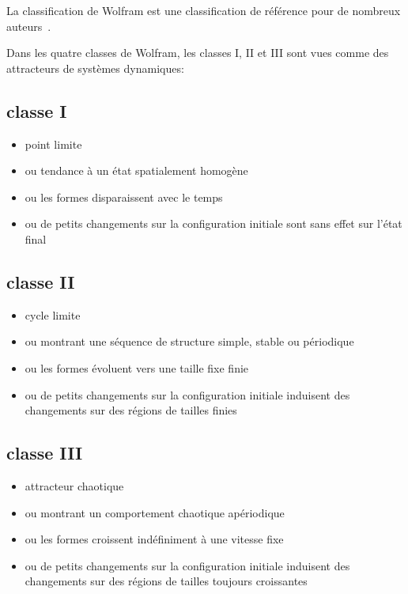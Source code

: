La classification de Wolfram est une classification de référence pour
de nombreux
auteurs~\cite[]{Vichniac90,Li90b,Wootters90,McIntosh90,Chate90,Gutowitz90b}.

Dans les quatre classes de Wolfram, %
les classes I, II et III sont vues comme des attracteurs de systèmes
dynamiques:

\subsection*{classe I}

\begin{itemize}
\item point limite
\item ou tendance à un état spatialement homogène
\item ou les formes disparaissent avec le temps
\item ou de petits changements sur la configuration initiale sont
  sans effet sur l'état final
\end{itemize}

\subsection*{classe II}

\begin{itemize}
\item cycle limite
\item ou montrant une séquence de structure simple, stable ou
  périodique
\item ou les formes évoluent vers une taille fixe finie
\item ou de petits changements sur la configuration initiale
  induisent des changements sur des régions de tailles finies
\end{itemize}

\subsection*{classe III}

\begin{itemize}
\item attracteur chaotique
\item ou montrant un comportement chaotique apériodique
\item ou les formes croissent indéfiniment à une vitesse fixe
\item ou de petits changements sur la configuration initiale
  induisent des changements sur des régions de tailles toujours
  croissantes
\end{itemize}

